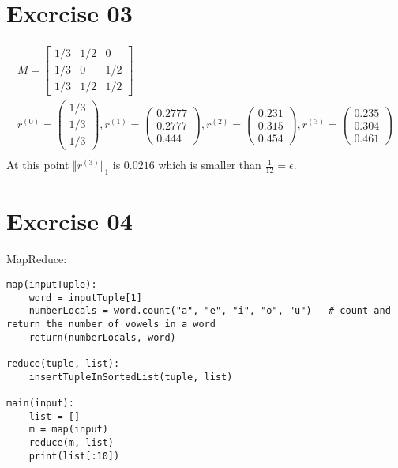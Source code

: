 \documentclass[11pt,a4paper]{scrartcl}
\begin{document}
\section*{Exercise 03}
\begin{align*}
M =
 \begin{bmatrix}
1/3 & 1/2 & 0 \\
1/3 & 0 & 1/2  \\
1/3 & 1/2 & 1/2
\end{bmatrix} \\
r^{(0)} = \left( \begin{array}{c}1/3\\1/3\\1/3\end{array} \right), 
r^{(1)} = \left( \begin{array}{c}0.2777\\0.2777\\0.444\end{array} \right), 
r^{(2)} = \left( \begin{array}{c}0.231\\0.315\\0.454\end{array} \right), 
r^{(3)} = \left( \begin{array}{c}0.235\\0.304\\0.461\end{array} \right)\\
\end{align*}
At this point $\Vert r^{(3)} \Vert_1$ is $0.0216$ which is smaller than $\frac{1}{12} = \epsilon$.

\section*{Exercise 04}

MapReduce:
\begin{lstlisting}
map(inputTuple):
	word = inputTuple[1]
	numberLocals = word.count("a", "e", "i", "o", "u")	 # count and return the number of vowels in a word
	return(numberLocals, word)
	
reduce(tuple, list):
	insertTupleInSortedList(tuple, list)
	
main(input):
	list = []
	m = map(input)
	reduce(m, list)
	print(list[:10])
\end{lstlisting}
\end{document}
